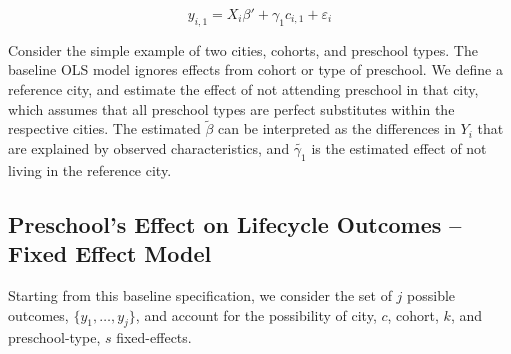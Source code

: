 \documentclass[11pt]{article}
\begin{document}
\begin{equation} \label{ols}
y_{i,1} =  X_i \beta' + \gamma_1 c_{i,1} + \varepsilon_{i}
\end{equation}

Consider the simple example of two cities, cohorts, and preschool types. The baseline OLS model ignores effects from cohort or type of preschool. We define a reference city, and estimate the effect of not attending preschool in that city, which assumes that all preschool types are perfect substitutes within the respective cities.  The estimated $\tilde{\beta}$ can be interpreted as the differences in $Y_i$ that are explained by observed characteristics, and  $\tilde{\gamma_1}$ is the estimated effect of not living in the reference city. 


\subsection{Preschool's Effect on Lifecycle Outcomes -- Fixed Effect Model}
Starting from this baseline specification, we consider the set of $j$ possible outcomes, $\{y_1, \dots, y_j\}$, and account for the possibility of city, $c$, cohort, $k$, and preschool-type, $s$ fixed-effects. %

\end{document}
